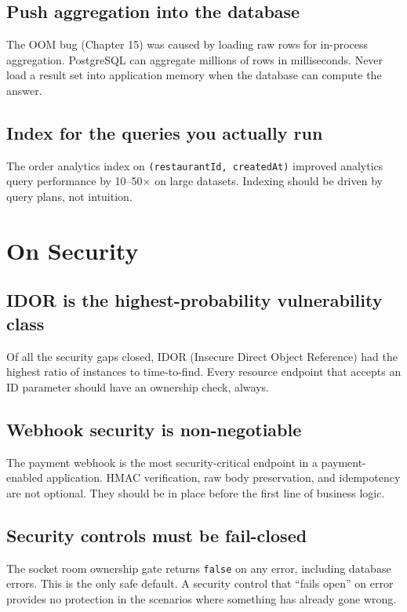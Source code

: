 \documentclass[11pt,a4paper,twoside]{book}
\begin{document}
\subsection{Push aggregation into the database}
The OOM bug (Chapter 15) was caused by loading raw rows for in-process
aggregation.  PostgreSQL can aggregate millions of rows in milliseconds.  Never
load a result set into application memory when the database can compute the
answer.

\subsection{Index for the queries you actually run}
The order analytics index on \texttt{(restaurantId, createdAt)} improved
analytics query performance by 10–50× on large datasets.  Indexing should be
driven by query plans, not intuition.

\section{On Security}

\subsection{IDOR is the highest-probability vulnerability class}
Of all the security gaps closed, IDOR (Insecure Direct Object Reference) had
the highest ratio of instances to time-to-find.  Every resource endpoint that
accepts an ID parameter should have an ownership check, always.

\subsection{Webhook security is non-negotiable}
The payment webhook is the most security-critical endpoint in a payment-enabled
application.  HMAC verification, raw body preservation, and idempotency are not
optional.  They should be in place before the first line of business logic.

\subsection{Security controls must be fail-closed}
The socket room ownership gate returns \texttt{false} on any error, including
database errors.  This is the only safe default.  A security control that
``fails open'' on error provides no protection in the scenarios where something
has already gone wrong.
\end{document}
